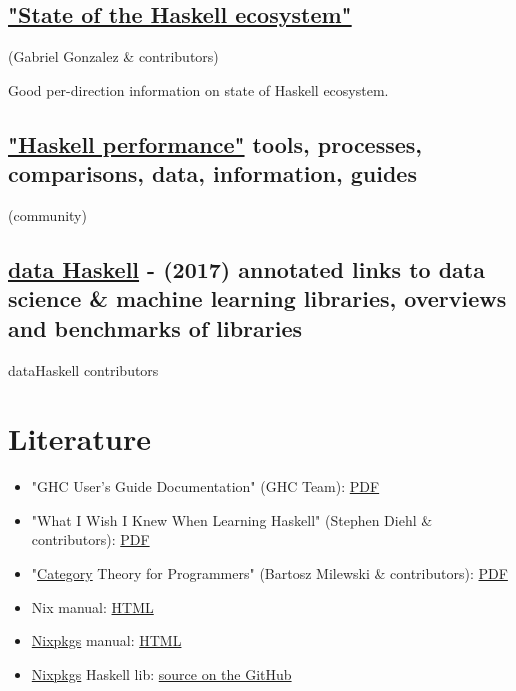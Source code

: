 \documentclass[a4paper,14pt,oneside]{book}
\begin{document}
\section{\href{https://github.com/Gabriel439/post-rfc/blob/master/sotu.md}{"State of the Haskell ecosystem"}}
\label{sec:orgcc6620f}
(Gabriel Gonzalez \& contributors)

Good per-direction information on state of Haskell ecosystem.

\section{\href{https://github.com/haskell-perf}{"Haskell performance"} tools, processes, comparisons, data, information, guides}
\label{sec:org1d111b9}
(community)

\section{\href{http://www.datahaskell.org/docs}{data Haskell} - (2017) annotated links to data science \& machine learning libraries, overviews and benchmarks of libraries}
\label{sec:org5a8d972}
dataHaskell contributors

\chapter{Literature}
\label{sec:orgeeef2fa}

\begin{itemize}
\item "GHC User’s Guide Documentation" (GHC Team): \href{https://downloads.haskell.org/\~ghc/latest/docs/users\_guide.pdf}{PDF}
\item "What I Wish I Knew When Learning Haskell" (Stephen Diehl \& contributors): \href{http://dev.stephendiehl.com/hask/tutorial.pdf}{PDF}
\item "\hyperref[org3fc54af]{Category} Theory for Programmers" (Bartosz Milewski \& contributors): \href{https://s3.amazonaws.com/milewski-ctfp-pdf/category-theory-for-programmers.pdf}{PDF}
\item Nix manual: \href{https://nixos.org/nix/manual/}{HTML}
\item \hyperref[orgf048d77]{Nixpkgs} manual: \href{https://nixos.org/nixpkgs/manual/}{HTML}
\item \hyperref[orgf048d77]{Nixpkgs} Haskell lib: \href{https://github.com/NixOS/nixpkgs/blob/master/pkgs/development/haskell-modules/lib.nix}{source on the GitHub}
\end{itemize}
\end{document}
